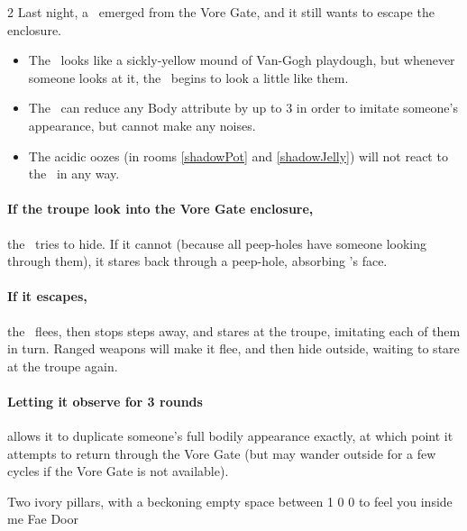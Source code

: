 \begin{multicols}{2}
Last night, a \superWierdzi\ emerged from the Vore Gate, and it still wants to escape the enclosure.

\null

\begin{itemize}
  \item
  The \superWierdzi\ looks like a sickly-yellow mound of Van-Gogh playdough, but whenever someone looks at it, the \superWierdzi\ begins to look a little like them.
  \item
  The \superWierdzi\ can reduce any Body \gls{attribute} by up to 3 in order to imitate someone's appearance, but cannot make any noises.
  \item
  The acidic oozes (in rooms \vref{shadowPot} and \vref{shadowJelly})
  will not react to the \superWierdzi\ in any way.
\end{itemize}

\paragraph{If the troupe look into the Vore Gate enclosure,}
the \superWierdzi\ tries to hide.
If it cannot (because all peep-holes have someone looking through them), it stares back through a peep-hole, absorbing 's face.

\paragraph{If it escapes,}
the \superWierdzi\ flees, then stops steps away, and stares at the troupe, imitating each of them in turn.
Ranged weapons will make it flee, and then hide outside, waiting to stare at the troupe again.

\setcounter{statDots}{0}
\mphlg

\paragraph{Letting it observe for 3 \glspl{round}}
allows it to duplicate someone's full bodily appearance exactly, at which point it attempts to return through the Vore Gate (but may wander outside for a few \glspl{cycle} if the Vore Gate is not available).


  {Two ivory pillars, with a beckoning empty space between}%
  {1}%
  {0}%
  {0}%
  {to feel you inside me}%
  {Fae Door}%
  {
    \setcounter{Fire}{3}
    \setcounter{Earth}{2}
    \setcounter{Fate}{1}
    \setcounter{Water}{1}
    \setcounter{Academics}{2}
    \setcounter{Cultivation}{1}
  }%


\end{multicols}
